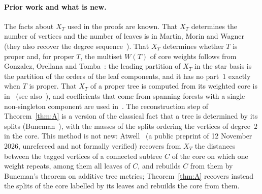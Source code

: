 \documentclass[11pt]{article}
\theoremstyle{definition}
\theoremstyle{remark}
\begin{document}
\paragraph{Prior work and what is new.} The facts about $X_T$ used in the proofs
are known. That $X_T$ determines the number of vertices and the number of
leaves is in Martin, Morin and Wagner~\cite[Proposition~2(i) and~(v)]{mmw} (they also
recover the degree sequence~\cite[Corollary~5]{mmw}). That $X_T$ determines
whether $T$ is proper and, for proper $T$, the multiset $W(T)$ of core weights
follows from Gonzalez, Orellana and Tomba~\cite[Theorem~4.15 and
Corollary~4.20]{got}: the leading partition of $X_T$ in the star basis is the
partition of the orders of the leaf components, and it has no part~$1$ exactly
when $T$ is proper. That $X_T$ of a proper tree is computed from its weighted
core is in~\cite[Theorem~5.10 and Corollary~5.11]{apdmoz} (see
also~\cite[Proposition~3.8]{ot}), and coefficients that come from spanning
forests with a single non-singleton component are used in~\cite[Lemma~7.4]{apdmoz}.
The reconstruction step of Theorem~\ref{thm:A} is a version of the classical
fact that a tree is determined by its splits (Buneman~\cite{buneman}), with the
masses of the splits ordering the vertices of degree~$2$ in the core. This
method is not new: Atwell~\cite[Theorem~2.1 and Lemma~5.1]{atwell1} (a public
preprint of 12 November 2026, unrefereed and not formally verified) recovers from $X_T$ the distances between the tagged vertices of a connected
subtree $C$ of the core on which one weight repeats, among them all leaves of $C$,
and rebuilds $C$ from them by Buneman's theorem on additive tree metrics; Theorem~\ref{thm:A} recovers instead the splits of the
core labelled by its leaves and rebuilds the core from them.
\end{document}
